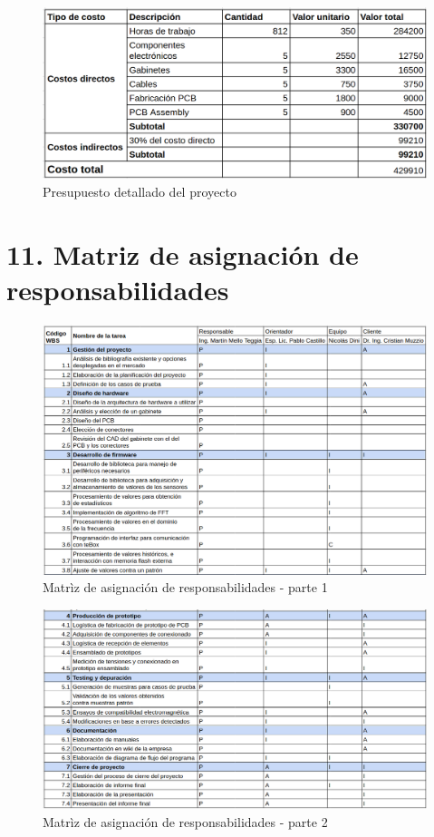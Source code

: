 \documentclass[11pt]{charter}
\begin{document}
\begin{figure}[htpb]
\centering 
\includegraphics[width=1\textwidth]{./Figuras/costos.png}
\caption{Presupuesto detallado del proyecto}
\label{fig:costos}
\end{figure}


\section{11. Matriz de asignación de responsabilidades}
\label{sec:responsabilidades}

\begin{figure}[h]
\centering 
\includegraphics[width=1\textwidth]{./Figuras/responsabilidades1.png}
\caption{Matrìz de asignación de responsabilidades - parte 1}
\label{fig:responsabilidades1}
\end{figure}

\begin{figure}[h]
\centering 
\includegraphics[width=1\textwidth]{./Figuras/responsabilidades2.png}
\caption{Matrìz de asignación de responsabilidades - parte 2}
\label{fig:responsabilidades2}
\end{figure}
\end{document}
